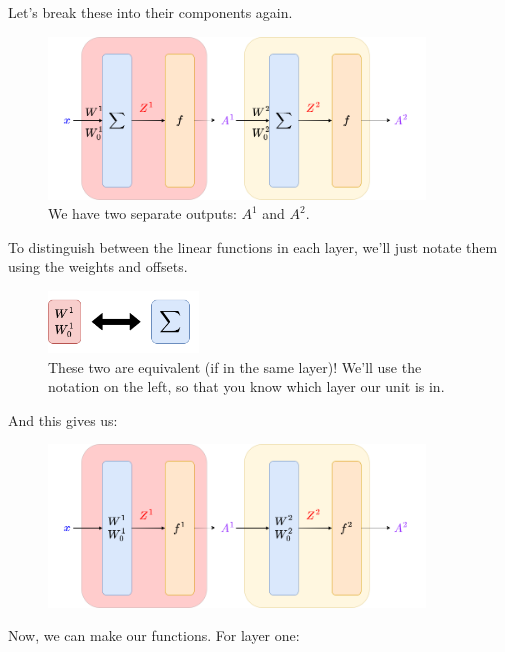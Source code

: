         Let's break these into their components again.
        
        \begin{figure}[H]
            \centering
            \includegraphics[width=100mm,scale=0.4]{images/nn_images/two_layers_internal.png}
            \caption*{We have two separate outputs: $A^1$ and $A^2$.}
        \end{figure}
        
        To distinguish between the linear functions in each layer, we'll just notate them using the weights and offsets.
        
        \begin{figure}[H]
            \centering
            \includegraphics[width=40mm,scale=0.4]{images/nn_images/linear_module_representation.png}
            \caption*{These two are equivalent (if in the same layer)! We'll use the notation on the left, so that you know which layer our unit is in.}
        \end{figure}
        
        And this gives us:
        
        \begin{figure}[H]
            \centering
            \includegraphics[width=100mm,scale=0.4]{images/nn_images/two_layer_new_notation.png}
        \end{figure}
        
        Now, we can make our functions. For layer one:
        
